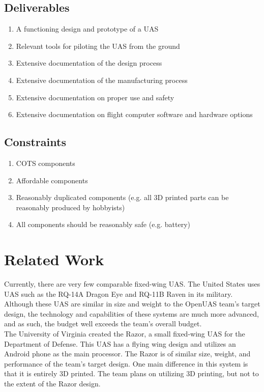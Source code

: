 \documentclass{article}
\begin{document}
\subsection{Deliverables}
\begin{enumerate}
\item A functioning design and prototype of a UAS
\item Relevant tools for piloting the UAS from the ground
\item Extensive documentation of the design process
\item Extensive documentation of the manufacturing process
\item Extensive documentation on proper use and safety
\item Extensive documentation on flight computer software and hardware options
\end{enumerate}

\subsection{Constraints}
\begin{enumerate}
\item COTS components
\item Affordable components
\item Reasonably duplicated components (e.g. all 3D printed parts can be reasonably produced by hobbyists)
\item All components should be reasonably safe (e.g. battery)
\end{enumerate}

\section{Related Work}
\noindent Currently, there are very few comparable fixed-wing UAS. The United States uses UAS such as the RQ-14A Dragon Eye and RQ-11B Raven in its military. Although these UAS are similar in size and weight to the OpenUAS team's target design, the technology and capabilities of these systems are much more advanced, and as such, the budget well exceeds the team's overall budget.\\

\noindent The University of Virginia created the Razor, a small fixed-wing UAS for the Department of Defense. This UAS has a flying wing design and utilizes an Android phone as the main processor. The Razor is of similar size, weight, and performance of the team's target design. One main difference in this system is that it is entirely 3D printed. The team plans on utilizing 3D printing, but not to the extent of the Razor design.\\
\end{document}
